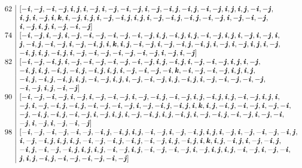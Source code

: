 \documentclass[12pt]{article}
\theoremstyle{definition}
\begin{document}
\[\begin{array}{r|l}
62 & [-\ii, -\jj, -\ii, -\jj, \ii, \jj, \ii, -\jj, \ii, -\jj, -\ii, -\jj, \ii, -\jj, -\ii, \jj, -\ii, \jj, -\ii, -\jj, \ii, \jj, \ii, \jj, -\ii, -\jj, \\
& \ii, \jj, \ii, -\jj, \ii, \kk, \ii, -\jj, \ii, \jj, \ii, -\jj, -\ii, \jj, \ii, \jj, \ii, -\jj, -\ii, \jj, -\ii, \jj, -\ii, -\jj, \ii, -\jj, -\ii, -\jj,\\
&  \ii, -\jj, \ii, \jj, \ii, -\jj, -\ii, -\jj]\\
74 & [-\ii, -\jj, \ii, -\jj, \ii, -\jj, -\ii, -\jj, -\ii, -\jj, -\ii, -\jj, \ii, \jj, -\ii, \jj, \ii, \jj, -\ii, -\jj, \ii, \jj, \ii, -\jj, \ii, -\jj, \ii,\\
&  \jj, -\ii, \jj, -\ii, -\jj, \ii, -\jj, -\ii, \jj, \ii, \kk, \ii, \jj, -\ii, -\jj, \ii, -\jj, -\ii, \jj, -\ii, \jj, \ii, -\jj, \ii, -\jj, \ii, \jj, \ii, -\jj,\\
&  -\ii, \jj, \ii, \jj, -\ii, \jj, \ii, -\jj, -\ii, -\jj, -\ii, -\jj, -\ii, -\jj, \ii, -\jj, \ii, -\jj]\\
82 & [-\ii,-\jj,-\ii,\jj,\ii,-\jj,-\ii,-\jj,-\ii,-\jj,-\ii,-\jj,\ii,\jj,-\ii,\jj,\ii,-\jj,-\ii,-\jj,\ii,\jj,\ii,-\jj,\\
& -\ii,\jj,\ii, \jj,-\ii,\jj,-\ii,\jj,-\ii,\jj,\ii,\jj,\ii,-\jj,-\ii,-\jj,-\ii,\kk,-\ii,-\jj,-\ii,-\jj,\ii,\jj,\ii,\jj,\\
& -\ii,\jj,-\ii,\jj,-\ii,\jj, \ii,\jj,-\ii,-\jj,\ii,\jj,\ii,-\jj,-\ii,-\jj,\ii,\jj,-\ii,\jj,\ii,-\jj,-\ii,-\jj,-\ii,-\jj,\\
& -\ii,-\jj,\ii,\jj,-\ii,-\jj]\\
90 & [-\ii, -\jj, -\ii, -\jj, \ii, -\jj, \ii, -\jj, -\ii, -\jj, \ii, -\jj, -\ii, \jj, -\ii, -\jj, \ii, \jj, -\ii, \jj, \ii, \jj, -\ii, -\jj, \ii, \jj, \ii, \\
& -\jj, \ii, -\jj, -\ii, \jj, -\ii, \jj, -\ii, -\jj, -\ii, -\jj, \ii, -\jj, -\ii, \jj, -\ii, \jj, \ii, \kk, \ii, \jj, -\ii, \jj, -\ii, -\jj, \ii, -\jj, -\ii, \\
& -\jj, -\ii, \jj, -\ii, \jj, -\ii, -\jj, \ii, -\jj, \ii, \jj, \ii, -\jj, -\ii, \jj, \ii, \jj, -\ii, \jj, \ii, -\jj, -\ii, \jj, -\ii, -\jj, \ii, -\jj, -\ii, \\
& -\jj, \ii, -\jj, \ii, -\jj, -\ii, -\jj]\\
98 & [-\ii, -\jj, -\ii, -\jj, -\ii, -\jj, -\ii, \jj, -\ii, \jj, \ii, \jj, -\ii, -\jj, \ii, -\jj, -\ii, \jj, \ii, \jj, \ii, -\jj, \ii, -\jj, -\ii, -\jj, -\ii, \jj,\\
&  \ii, -\jj, -\ii, \jj, \ii, \jj, \ii, \jj, -\ii, -\jj, -\ii, \jj, -\ii, \jj, -\ii, -\jj, \ii, \jj, -\ii, \jj, \ii, \kk, \ii, \jj, -\ii, \jj, \ii, -\jj, -\ii, \jj,\\
&  -\ii, \jj, -\ii, -\jj, -\ii, \jj, \ii, \jj, \ii, \jj, -\ii, -\jj, \ii, \jj, -\ii, -\jj, -\ii, -\jj, \ii, -\jj, \ii, \jj, \ii, \jj, -\ii, -\jj, \ii, -\jj, -\ii, \\
& \jj, \ii, \jj, -\ii, \jj, -\ii, -\jj, -\ii, -\jj, -\ii, -\jj]\\
\end{array}
\]
\end{document}
